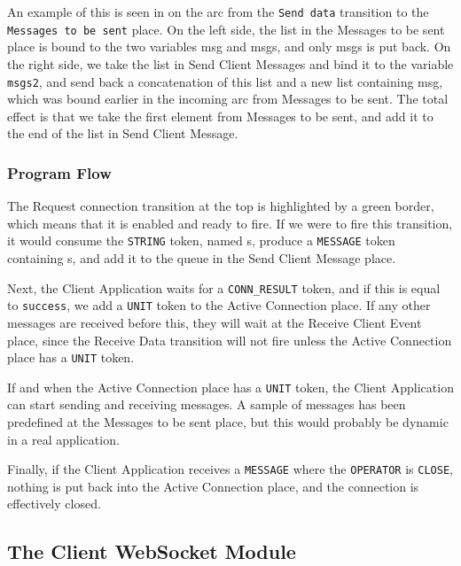 		An example of this is seen in  on the arc
		from the \lstinline:Send data: transition to the 
		\lstinline:Messages to be sent: place. On the left side, the list in the
		Messages to be sent place is bound to the two variables msg and msgs, and only
		msgs is put back. On the right side, we take the list in Send Client Messages
		and bind it to the variable \lstinline:msgs2:, and send back a concatenation
		of this list and a new list containing msg, which was bound earlier in the incoming arc
		from Messages to be sent. The total effect is that we take the first element
		from Messages to be sent, and add it to the end of the list in Send Client
		Message.

	\subsubsection{Program Flow}
	
		The Request connection transition at the top is highlighted by a green border,
		which means that it is enabled and ready to fire. If we were to fire this transition,
		it would consume the \lstinline:STRING: token, named s, produce a
		\lstinline:MESSAGE: token containing s, and add it to the queue in the Send
		Client Message place.
		
		Next, the Client Application waits for a \lstinline:CONN_RESULT: token, and if
		this is equal to \lstinline:success:, we add a \lstinline:UNIT: token to the
		Active Connection place. If any other messages are received before this, they
		will wait at the Receive Client Event place, since the Receive Data transition
		will not fire unless the Active Connection place has a \lstinline:UNIT: token.
		
		If and when the Active Connection place has a \lstinline:UNIT: token, the
		Client Application can start sending and receiving messages. A sample of
		messages has been predefined at the Messages to be sent place, but this would
		probably be dynamic in a real application. 
		
		Finally, if the Client Application receives a \lstinline:MESSAGE: where the
		\lstinline:OPERATOR: is \lstinline:CLOSE:, nothing is put back into the Active
		Connection place, and the connection is effectively closed. 

\subsection{The Client WebSocket Module}

